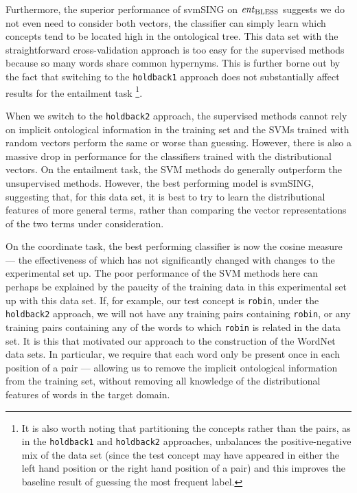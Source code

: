 \documentclass[11pt]{article}
\newcommand\entBLESS{\mbox{\em ent\/}_{\mbox{\scriptsize BLESS}}}
\begin{document}
Furthermore, the superior performance of svmSING on $\entBLESS$ suggests we do not even need to consider both vectors, the classifier can simply learn which concepts tend to be located high in the ontological tree.  This data set with the straightforward cross-validation approach is too easy for the supervised methods because so many words share common hypernyms.  This is further borne out by the fact that switching to the \texttt{holdback1} approach does not substantially affect results for the entailment task \footnote{It is also worth noting that partitioning the concepts rather than the pairs, as in the \texttt{holdback1} and \texttt{holdback2} approaches,  unbalances the positive-negative mix of the data set (since the test concept may have appeared in either the left hand position or the right hand position of a pair) and this improves the baseline result of guessing the most frequent label.}.

When we switch to the \texttt{holdback2} approach, the supervised methods cannot rely on implicit ontological information in the training set and the SVMs trained with random vectors perform the same or worse than guessing.  However, there is also a massive drop in performance for the classifiers trained with the distributional vectors.   On the entailment task, the SVM methods do generally outperform the unsupervised methods.  However, the best performing model is svmSING, suggesting that, for this data set, it is best to try to learn the distributional features of more general terms, rather than comparing the vector representations of the two terms under consideration.   

On the coordinate task, the best performing classifier is now the cosine measure --- the effectiveness of which has not significantly changed with changes to the experimental set up.   The poor performance of the SVM methods here can perhaps be explained by the paucity of the training data in this experimental set up with this data set.  If, for example, our test concept is \texttt{robin}, under the \texttt{holdback2} approach, we will not have any training pairs containing \texttt{robin}, or any training pairs containing any of the words to which \texttt{robin} is related in the data set.  It is this that motivated our approach to the construction of the WordNet data sets. In particular, we require that each word only be present once in each position of a pair --- allowing us to remove the implicit ontological information from the training set, without removing all knowledge of the distributional features of words in the target domain.
\end{document}
